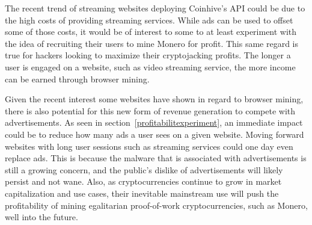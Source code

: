 The recent trend of streaming websites deploying Coinhive's API could be due to the high costs of providing streaming services. While ads can be used to offset some of those costs, it would be of interest to some to at least experiment with the idea of recruiting their users to mine Monero for profit. This same regard is true for hackers looking to maximize their cryptojacking profits. The longer a user is engaged on a website, such as video streaming service, the more income can be earned through browser mining.

Given the recent interest some websites have shown in regard to browser mining, there is also potential for this new form of revenue generation to compete with advertisements. As seen in section~\ref{profitabilitexperiment}, an immediate impact could be to reduce how many ads a user sees on a given website. Moving forward websites with long user sessions such as streaming services could one day even replace ads. This is because the malware that is associated with advertisements is still a growing concern, and the public's dislike of advertisements will likely persist and not wane. Also, as cryptocurrencies continue to grow in market capitalization and use cases, their inevitable mainstream use will push the profitability of mining egalitarian proof-of-work cryptocurrencies, such as Monero, well into the future. 





















